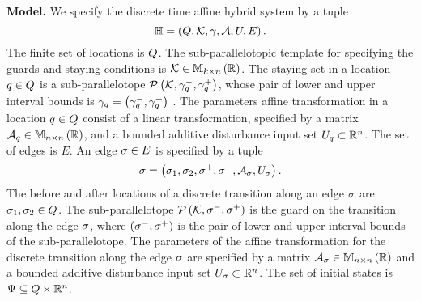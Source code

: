 {\bf Model.}  We specify the discrete time affine hybrid system
by a tuple 
\[
\mathbb{H} = \left(Q,\mathcal{K},\gamma,\mathcal{A},U,E\right).
\]
%
The finite set of locations is $Q$.  The sub-parallelotopic
template for specifying the guards and staying conditions is
$\mathcal{K}\in\mathbb{M}_{k\times n}\left(\mathbb{R}\right)$.  The staying set in a location
$q\in Q$ is a sub-parallelotope
$\mathcal{P}\left(\mathcal{K},\gamma_q^-,\gamma_q^+\right)$, whose pair of
lower and upper interval bounds is
$\gamma_q=\left(\gamma_q^-,\gamma_q^+\right)$ .  The
parameters affine transformation in a location $q\in Q$
consist of a linear transformation, specified by a matrix
$\mathcal{A}_q\in\mathbb{M}_{n\times n}\left(\mathbb{R}\right)$, and a bounded additive
disturbance input set $U_q\subset\mathbb{R}^n$.  The set of
edges is $E$.  An edge $\sigma\in E$ is specified by a tuple
%
\[
\sigma=\left(\sigma_1,\sigma_2,\sigma^+,\sigma^-,\mathcal{A}_\sigma,U_\sigma\right).
\]
%
The before and after locations of a discrete transition along an edge
$\sigma$ are ${\sigma_1,\sigma_2\in Q}$.  The sub-parallelotope
$\mathcal{P}\left(\mathcal{K},\sigma^-,\sigma^+\right)$ is the guard on the
transition along the edge $\sigma$, where
$\left({\sigma^-},{\sigma^+}\right)$ is the pair of lower and
upper interval bounds of the sub-parallelotope.  The
parameters of the affine transformation for the discrete transition
along the edge $\sigma$ are specified by a matrix
${\mathcal{A}_\sigma\in\mathbb{M}_{n\times n}\left(\mathbb{R}\right)}$  and a bounded additive
disturbance input set $U_\sigma\subset\mathbb{R}^n$.  The set of
initial states is
$\Psi\subseteq Q\times\mathbb{R}^n$.

